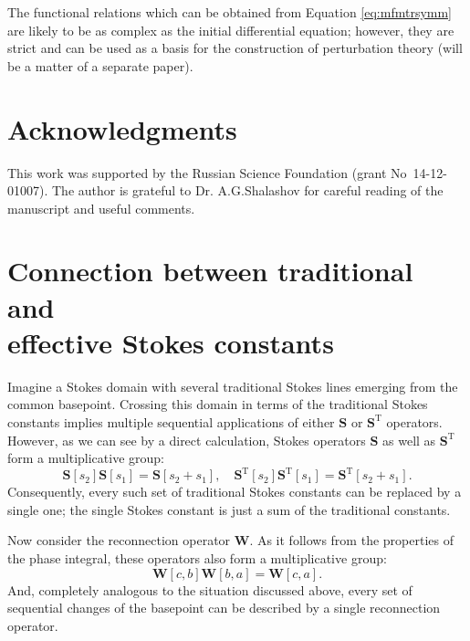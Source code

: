 \documentclass[atmp]{ipart_v1}
\def\S{\bm{S}}
\def\W{\bm{W}}
\def\T{\mathrm{T}}
\newcommand\Eref[1]{Equation \ref{#1}}
\begin{document}
The functional relations which can be obtained from \Eref{eq:mfmtrsymm} are likely to be as 
complex as the initial differential equation; however, they are strict and can be used as 
a basis for the construction of perturbation theory (will be a matter of a separate paper).

\section*{Acknowledgments}
This work was supported by the Russian Science Foundation (grant No~14-12-01007). The author is grateful to
Dr. A.G.Shalashov for careful reading of the manuscript and useful comments.
















\appendix

\section{Connection between traditional and \\ effective Stokes constants \label{app1}}

Imagine a Stokes domain with several traditional Stokes lines 
emerging from the common basepoint. Crossing this domain in terms of the traditional Stokes constants
implies multiple sequential applications of either $\S$ or $\S^{\T}$ operators. 
However, as we can see by a direct calculation, Stokes operators $\S$ as well as $\S^{\T}$ 
form a multiplicative group:
\begin{equation}
\S[s_2]\S[s_1] = \S[s_2 + s_1], \quad
\S^{\T}[s_2]\S^{\T}[s_1] = \S^{\T}[s_2 + s_1].
\end{equation}
Consequently, every such set of traditional Stokes constants can be replaced by a single one;
the single Stokes constant is just a sum of the traditional constants.

Now consider the reconnection operator $\W$. As it follows from the properties of the phase integral, 
these operators also form a multiplicative group:
\begin{equation}
\W[c,b]\W[b,a] = \W[c,a].
\end{equation}
And, completely analogous to the situation discussed above, every set of sequential changes of the basepoint
can be described by a single reconnection operator.
\end{document}
